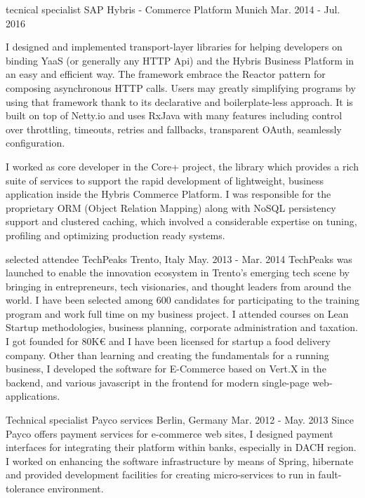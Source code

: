 \begin{cventries}
  \cventry
    {tecnical specialist} %
    {SAP Hybris - Commerce Platform} %
    {Munich} %
    {Mar. 2014 - Jul. 2016} %
    {
      \begin{cvitems}
        \item I designed and implemented transport-layer libraries for helping developers on binding YaaS (or generally any HTTP Api) and the Hybris Business Platform in an easy and efficient way.
      The framework embrace the Reactor pattern for composing asynchronous HTTP calls. Users may greatly simplifying programs by using that framework thank to its declarative and boilerplate-less
      approach. It is built on top of Netty.io and uses RxJava with many features including control over throttling, timeouts, retries and fallbacks, transparent OAuth, seamlessly configuration.
        \item I worked as core developer in the Core+ project, the library which provides a rich suite of services to support the rapid development of lightweight, business application inside the
      Hybris Commerce Platform. I was responsible for the proprietary ORM (Object Relation Mapping) along with NoSQL persistency support and clustered caching, which involved a considerable expertise on tuning,
      profiling and optimizing production ready systems.
      \end{cvitems}
    }

  \cventry
    {selected attendee} %
    {TechPeaks} %
    {Trento, Italy} %
    {May. 2013 - Mar. 2014} %
    {
    TechPeaks was launched to enable the innovation ecosystem in Trento’s emerging tech scene by bringing in entrepreneurs, tech visionaries, and thought leaders from around the world.
    I have been selected among 600 candidates for participating to the training program and work full time on my business project.
    I attended courses on Lean Startup methodologies, business planning, corporate administration and taxation.
    I got founded for 80K€ and I have been licensed for startup a food delivery company.
    Other than learning and creating the fundamentals for a running business, I developed the software for E-Commerce based on Vert.X in the backend, and various javascript in the frontend
    for modern single-page web-applications.
    }

  \cventry
    {Technical specialist} %
    {Payco services} %
    {Berlin, Germany} %
    {Mar. 2012 - May. 2013} %
    {
      Since Payco offers payment services for e-commerce web sites, I designed payment interfaces for integrating their platform
      within banks, especially in DACH region. I worked on enhancing the software infrastructure by means of
      Spring, hibernate and provided development facilities for creating micro-services to run in fault-tolerance environment.
    }


\end{cventries}
